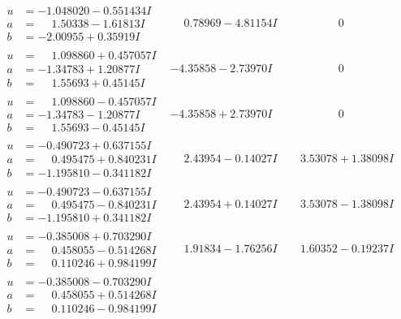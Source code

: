 \documentclass[1p]{elsarticle_modified}
\theoremstyle{definition}
\begin{document}
$$\begin{array}{c|c|c}
\begin{aligned}
u &= -1.048020 - 0.551434 I \\
a &= \phantom{-}1.50338 - 1.61813 I \\
b &= -2.00955 + 0.35919 I\end{aligned}
 & \phantom{-}0.78969 - 4.81154 I & \phantom{-0.000000 } 0 \\ \hline\begin{aligned}
u &= \phantom{-}1.098860 + 0.457057 I \\
a &= -1.34783 + 1.20877 I \\
b &= \phantom{-}1.55693 + 0.45145 I\end{aligned}
 & -4.35858 - 2.73970 I & \phantom{-0.000000 } 0 \\ \hline\begin{aligned}
u &= \phantom{-}1.098860 - 0.457057 I \\
a &= -1.34783 - 1.20877 I \\
b &= \phantom{-}1.55693 - 0.45145 I\end{aligned}
 & -4.35858 + 2.73970 I & \phantom{-0.000000 } 0 \\ \hline\begin{aligned}
u &= -0.490723 + 0.637155 I \\
a &= \phantom{-}0.495475 + 0.840231 I \\
b &= -1.195810 - 0.341182 I\end{aligned}
 & \phantom{-}2.43954 - 0.14027 I & \phantom{-}3.53078 + 1.38098 I \\ \hline\begin{aligned}
u &= -0.490723 - 0.637155 I \\
a &= \phantom{-}0.495475 - 0.840231 I \\
b &= -1.195810 + 0.341182 I\end{aligned}
 & \phantom{-}2.43954 + 0.14027 I & \phantom{-}3.53078 - 1.38098 I \\ \hline\begin{aligned}
u &= -0.385008 + 0.703290 I \\
a &= \phantom{-}0.458055 - 0.514268 I \\
b &= \phantom{-}0.110246 + 0.984199 I\end{aligned}
 & \phantom{-}1.91834 - 1.76256 I & \phantom{-}1.60352 - 0.19237 I \\ \hline\begin{aligned}
u &= -0.385008 - 0.703290 I \\
a &= \phantom{-}0.458055 + 0.514268 I \\
b &= \phantom{-}0.110246 - 0.984199 I\end{aligned}

\end{array}$$
\end{document}
